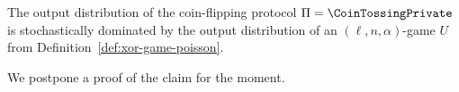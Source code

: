 			




\begin{claim}\label{claim:correspondence-poissongame}
	The output distribution of the coin-flipping protocol $\Pi = \CoinTossingPrivate$ 
	is 
	stochastically dominated by the 
	output distribution of 
	an $(\ell, n, \alpha)$-game $U$ 
	from Definition~\ref{def:xor-game-poisson}.
\end{claim}
We postpone a proof of the claim for the moment.

